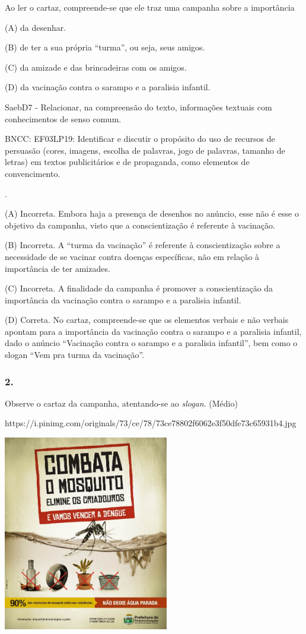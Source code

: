 Ao ler o cartaz, compreende-se que ele traz uma campanha sobre a
importância

(A) da desenhar.

(B) de ter a sua própria ``turma'', ou seja, seus amigos.

(C) da amizade e das brincadeiras com os amigos.

(D) da vacinação contra o sarampo e a paralisia infantil.

SaebD7 - Relacionar, na compreensão do texto, informações textuais com
conhecimentos de senso comum.

BNCC: EF03LP19: Identificar e discutir o propósito do uso de recursos de
persuasão (cores, imagens, escolha de palavras, jogo de palavras,
tamanho de letras) em textos publicitários e de propaganda, como
elementos de convencimento.

.

(A) Incorreta. Embora haja a presença de desenhos no anúncio, esse não é
esse o objetivo da campanha, visto que a conscientização é referente à
vacinação.

(B) Incorreta. A ``turma da vacinação'' é referente à conscientização
sobre a necessidade de se vacinar contra doenças específicas, não em
relação à importância de ter amizades.

(C) Incorreta. A finalidade da campanha é promover a conscientização da
importância da vacinação contra o sarampo e a paralisia infantil.

(D) Correta. No cartaz, compreende-se que os elementos verbais e não
verbais apontam para a importância da vacinação contra o sarampo e a
paralisia infantil, dado o anúncio ``Vacinação contra o sarampo e a
paralisia infantil'', bem como o slogan ``Vem pra turma da vacinação''.

\subsubsection{2. }\label{section-45}

Observe o cartaz da campanha, atentando-se ao \emph{slogan}. (Médio)

https://i.pinimg.com/originals/73/ce/78/73ce78802f6062e3f50dfe73c65931b4.jpg

\includegraphics[width=2.84375in,height=3.36642in]{media/image13.jpeg}

